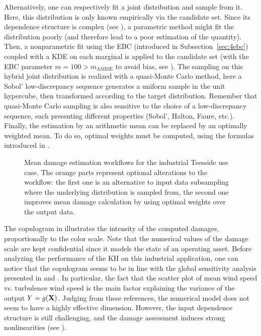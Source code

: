 Alternatively, one can respectively fit a joint distribution and sample from it. 
Here, this distribution is only known empirically via the candidate set. 
Since its dependence structure is complex (see ), a parametric method might fit the distribution poorly (and therefore lead to a poor estimation of the quantity). 
Then, a nonparametric fit using the EBC (introduced in Subsection~\ref{sec:4ebc}) coupled with a KDE on each marginal is applied to the candidate set (with the EBC parameter $m=100 > m_{\mbox{AMISE}}$ to avoid bias, see \citealp[p.117]{lasserre_2022}). 
The sampling on this hybrid joint distribution is realized with a quasi-Monte Carlo method, here a Sobol' low-discrepancy sequence generates a uniform sample in the unit hypercube, then transformed according to the target distribution. 
Remember that quasi-Monte Carlo sampling is also sensitive to the choice of a low-discrepancy sequence, each presenting different properties (Sobol', Halton, Faure, etc.). 
Finally, the estimation by an arithmetic mean can be replaced by an optimally weighted mean. 
To do so, optimal weights must be computed, using the formulas introduced in .

\begin{figure}[!h]
    \centering
    
    \caption{Mean damage estimation workflows for the industrial Teesside use case. 
    The orange parts represent optional alterations to the workflow: 
    the first one is an alternative to input data subsampling where the underlying distribution is sampled from, 
    the second one improves mean damage calculation by using optimal weights over the output data.}
    \label{fig:sampling_diagram}
\end{figure}


The copulogram in  illustrates the intensity of the computed damages, proportionally to the color scale. 
Note that the numerical values of the damage scale are kept confidential since it models the state of an operating asset.
Before analyzing the performance of the KH on this industrial application, one can notice that the copulogram  seems to be in line with the global sensitivity analysis presented in \cite{murcia_dimitrov_2018} and \cite{li_zhan_2020}. 
In particular, the fact that the scatter plot of mean wind speed vs. turbulence wind speed is the main factor explaining the variance of the output $Y=g({\bf X})$. 
Judging from these references, the numerical model does not seem to have a highly effective dimension. 
However, the input dependence structure is still challenging, and the damage assessment induces strong nonlinearities (see ). 

